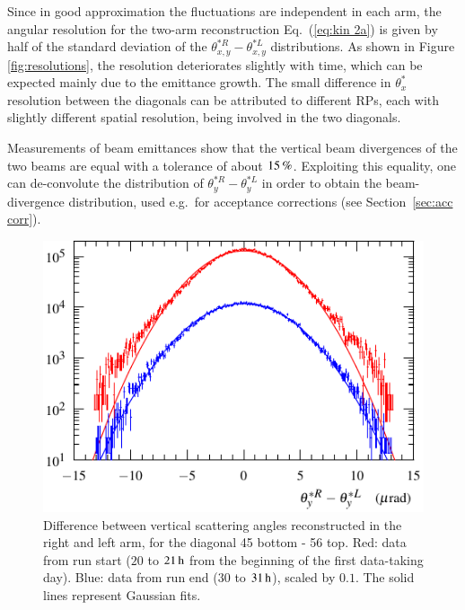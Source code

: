 Since in good approximation the fluctuations are independent in each arm, the angular resolution for the two-arm reconstruction Eq.~(\ref{eq:kin 2a}) is given by half of the standard deviation of the $\theta_{x,y}^{*R} - \theta_{x,y}^{*L}$ distributions. As shown in Figure \ref{fig:resolutions}, the resolution deteriorates slightly with time, which can be expected mainly due to the emittance growth. The small difference in $\theta_x^*$ resolution between the diagonals can be attributed to different RPs, each with slightly different spatial resolution, being involved in the two diagonals.

Measurements of beam emittances  show that the vertical beam divergences of the two beams are equal with a tolerance of about $15\,{\rm \%}$. Exploiting this equality, one can de-convolute the distribution of $\theta_y^{*R} - \theta_y^{*L}$ in order to obtain the beam-divergence distribution, used e.g.~for acceptance corrections (see Section~\ref{sec:acc corr}).

\begin{figure}
\begin{center}
\includegraphics{fig/beam_divergence_fits.pdf}
\vskip-4mm
\caption{%
Difference between vertical scattering angles reconstructed in the right and left arm, for the diagonal 45 bottom - 56 top. Red: data from run start ($20$ to $21\,{\rm h}$ from the beginning of the first data-taking day). Blue: data from run end ($30$ to $31\,{\rm h}$), scaled by $0.1$. The solid lines represent Gaussian fits.
}
\label{fig:beam divergence}
\end{center}
\end{figure}



